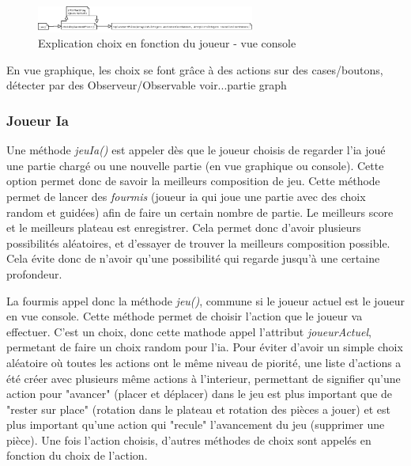         \begin{figure}[H]
			\centering\includegraphics[width=0.64\textwidth, keepaspectratio]{img/graphJoueurChoix.png}
			\caption{Explication choix en fonction du joueur - vue console}
			\label{fig:graphJoueurChoix}
		\end{figure}

        En vue graphique, les choix se font grâce à des actions sur des cases/boutons, détecter par des Observeur/Observable voir...partie graph

        \subsubsection{Joueur Ia}\label{subsub:jeuIa}
        Une méthode \textit{jeuIa()} est appeler dès que le joueur choisis de regarder l'ia joué une partie chargé ou une nouvelle partie (en vue graphique ou console). Cette option permet donc de savoir la meilleurs composition de jeu.
        Cette méthode permet de lancer des \textit{fourmis} (joueur ia qui joue une partie avec des choix random et guidées) afin de faire un certain nombre de partie. Le meilleurs score et le meilleurs plateau est enregistrer. Cela permet donc d'avoir plusieurs possibilités aléatoires, et d'essayer de trouver la meilleurs composition possible. Cela évite donc de n'avoir qu'une possibilité qui regarde jusqu'à une certaine profondeur.

        La fourmis appel donc la méthode \textit{jeu()}, commune si le joueur actuel est le joueur en vue console. Cette méthode permet de choisir l'action que le joueur va effectuer. C'est un choix, donc cette mathode appel l'attribut \textit{joueurActuel}, permetant de faire un choix random pour  l'ia. Pour éviter d'avoir un simple choix aléatoire où toutes les actions ont le même niveau de piorité, une liste d'actions a été créer avec plusieurs même actions à l'interieur, permettant de signifier qu'une action pour "avancer" (placer et déplacer) dans le jeu est plus important que de "rester sur place" (rotation dans le plateau et rotation des pièces a jouer) et est plus important qu'une action qui "recule" l'avancement du jeu (supprimer une pièce). Une fois l'action choisis, d'autres méthodes de choix sont appelés en fonction du choix de l'action.

